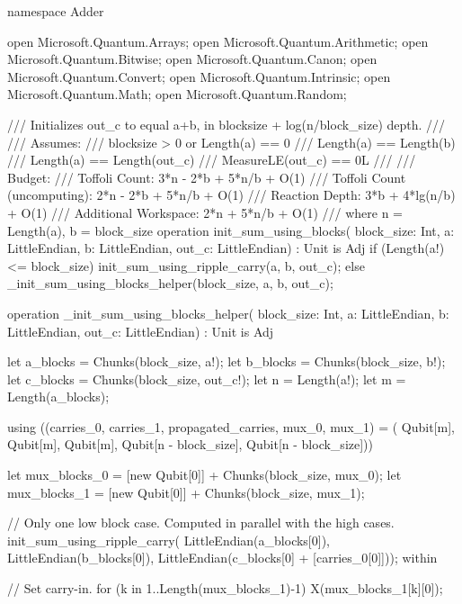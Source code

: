 \documentclass[onecolumn,unpublished]{quantumarticle}
\theoremstyle{definition}
\theoremstyle{definition}
\theoremstyle{definition}
\begin{document}
\begin{qsharp}
namespace Adder {
    open Microsoft.Quantum.Arrays;
    open Microsoft.Quantum.Arithmetic;
    open Microsoft.Quantum.Bitwise;
    open Microsoft.Quantum.Canon;
    open Microsoft.Quantum.Convert;
    open Microsoft.Quantum.Intrinsic;
    open Microsoft.Quantum.Math;
    open Microsoft.Quantum.Random;

    /// Initializes out_c to equal a+b, in blocksize + log(n/block_size) depth.
    ///
    /// Assumes:
    ///     blocksize > 0 or Length(a) == 0
    ///     Length(a) == Length(b)
    ///     Length(a) == Length(out_c)
    ///     MeasureLE(out_c) == 0L
    ///
    /// Budget:
    ///     Toffoli Count: 3*n - 2*b + 5*n/b + O(1)
    ///     Toffoli Count (uncomputing): 2*n - 2*b + 5*n/b + O(1)
    ///     Reaction Depth: 3*b + 4*lg(n/b) + O(1)
    ///     Additional Workspace: 2*n + 5*n/b + O(1)
    ///     where n = Length(a), b = block_size
    operation init_sum_using_blocks(
            block_size: Int,
            a: LittleEndian,
            b: LittleEndian,
            out_c: LittleEndian) : Unit is Adj {
        if (Length(a!) <= block_size) {
            init_sum_using_ripple_carry(a, b, out_c);
        } else {
            _init_sum_using_blocks_helper(block_size, a, b, out_c);
        }
    }

    operation _init_sum_using_blocks_helper(
            block_size: Int,
            a: LittleEndian,
            b: LittleEndian,
            out_c: LittleEndian) : Unit is Adj {
        let a_blocks = Chunks(block_size, a!);
        let b_blocks = Chunks(block_size, b!);
        let c_blocks = Chunks(block_size, out_c!);
        let n = Length(a!);
        let m = Length(a_blocks);

        using ((carries_0, carries_1, propagated_carries, mux_0, mux_1) = (
                Qubit[m], 
                Qubit[m], 
                Qubit[m],
                Qubit[n - block_size], 
                Qubit[n - block_size])) {
            let mux_blocks_0 = [new Qubit[0]] + Chunks(block_size, mux_0);
            let mux_blocks_1 = [new Qubit[0]] + Chunks(block_size, mux_1);

            // Only one low block case. Computed in parallel with the high cases.
            init_sum_using_ripple_carry(
                LittleEndian(a_blocks[0]),
                LittleEndian(b_blocks[0]),
                LittleEndian(c_blocks[0] + [carries_0[0]]));
            within {
                // Set carry-in.
                for (k in 1..Length(mux_blocks_1)-1) {
                    X(mux_blocks_1[k][0]);
                }

}}}}
\end{qsharp}
\end{document}

